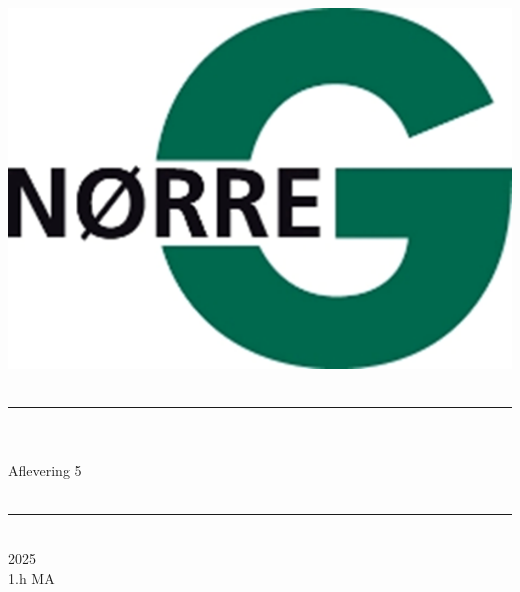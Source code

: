 \documentclass[12pt,x11names,a4paper]{article}
\begin{document}
%

\begin{titlepage}

\begin{minipage}{0.27\textwidth}

\end{minipage}
\begin{minipage}{0.73\textwidth}
\begin{center}
\phantom{h} \vspace{1cm}\\
\hspace{4cm}
\includegraphics[scale = 1]{Billeder/Norreg.png} \\
\phantom{h} \vspace{5cm}\\
\rule{0.7\textwidth}{0.3mm}\\
\phantom{h}\\
{\fontsize{50}{60}\selectfont Aflevering 5}\\
\phantom{h}\\
\rule{0.7\textwidth}{0.3mm}\\
\Large 2025\\
\Large 1.h MA

\end{center}
\end{minipage}
\end{titlepage}
\end{document}
